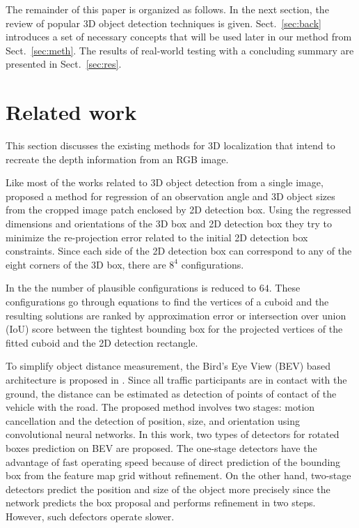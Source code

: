 \documentclass[graybox]{svmult}
\begin{document}
The remainder of this paper is organized as follows. In the next section, the review of popular 3D object detection techniques is given. 
Sect.~\ref{sec:back}  introduces a set of necessary concepts that will be used later in our method from Sect.~\ref{sec:meth}.
The results of real-world testing with a concluding summary are presented in Sect.~\ref{sec:res}.

\section{Related work}
This section discusses the existing methods for 3D localization that intend to recreate the depth information from an RGB image.

Like most of the works related to 3D object detection from a single image, \cite{3d_geom} proposed a method for regression of an observation angle and 3D object sizes from the cropped image patch enclosed by 2D detection box. Using the regressed dimensions and orientations of the 3D box and 2D detection box they try to minimize the re-projection error related to the initial 2D detection box constraints.
Since each side of the 2D detection box can correspond to any of the eight corners of the 3D box, there are $8^4$ configurations.


In the \cite{3d_geom_reduced} the number of plausible configurations is reduced to $64$.
These configurations go through equations to find the vertices of a cuboid and the resulting solutions are ranked by approximation error or intersection over union (IoU) score between the tightest bounding box for the projected vertices of the fitted cuboid and the 2D detection rectangle.


To simplify object distance measurement, the Bird's Eye View (BEV) based architecture is proposed in  
\cite{bev_1}. Since all traffic participants are in contact with the ground, the distance can be estimated as detection of points of contact of the vehicle with the road. The proposed method involves two stages: motion cancellation and the detection of position, size,
and orientation using convolutional neural networks. In this work, two types of detectors for rotated boxes prediction on BEV are proposed.
The one-stage detectors have the advantage of fast operating speed because of direct prediction of the bounding box from the feature map grid without refinement.
On the other hand, two-stage detectors predict the position and size of the object more precisely since the network predicts the box proposal and performs refinement in two steps.
However, such defectors operate slower.
\end{document}
